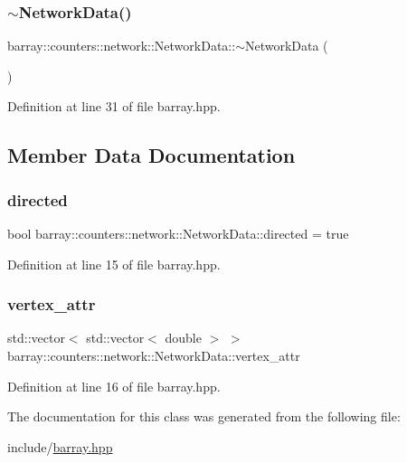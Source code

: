 \subsubsection{\texorpdfstring{$\sim$\+Network\+Data()}{~NetworkData()}}
{\footnotesize\ttfamily barray\+::counters\+::network\+::\+Network\+Data\+::$\sim$\+Network\+Data (\begin{DoxyParamCaption}{ }\end{DoxyParamCaption})\hspace{0.3cm}{\ttfamily [inline]}}



Definition at line 31 of file barray.\+hpp.



\subsection{Member Data Documentation}
\mbox{\label{classbarray_1_1counters_1_1network_1_1_network_data_a43001a7fe5f55186e2dbeea68fa57c71}} 
\subsubsection{\texorpdfstring{directed}{directed}}
{\footnotesize\ttfamily bool barray\+::counters\+::network\+::\+Network\+Data\+::directed = true}



Definition at line 15 of file barray.\+hpp.

\mbox{\label{classbarray_1_1counters_1_1network_1_1_network_data_adada150198dbde793c5ebe56e15c2f54}} 
\subsubsection{\texorpdfstring{vertex\+\_\+attr}{vertex\_attr}}
{\footnotesize\ttfamily std\+::vector$<$ std\+::vector$<$ double $>$ $>$ barray\+::counters\+::network\+::\+Network\+Data\+::vertex\+\_\+attr}



Definition at line 16 of file barray.\+hpp.



The documentation for this class was generated from the following file\+:\begin{DoxyCompactItemize}
\item 
include/\hyperlink{barray_8hpp}{barray.\+hpp}\end{DoxyCompactItemize}
